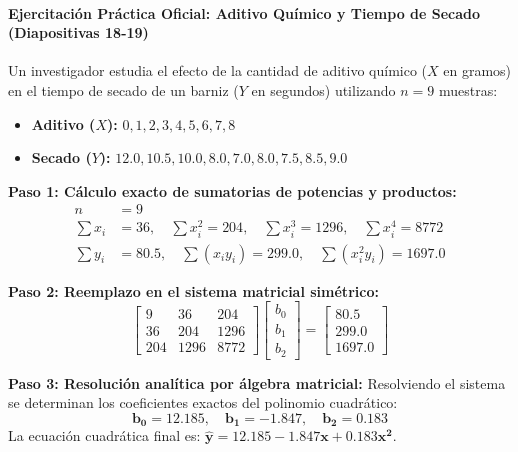 \documentclass[11pt,letterpaper]{article}
\begin{document}
\paragraph{Ejercitación Práctica Oficial: Aditivo Químico y Tiempo de Secado (Diapositivas 18-19)}
Un investigador estudia el efecto de la cantidad de aditivo químico ($X$ en gramos) en el tiempo de secado de un barniz ($Y$ en segundos) utilizando $n = 9$ muestras:
\begin{itemize}
    \item \textbf{Aditivo ($X$):} $0, 1, 2, 3, 4, 5, 6, 7, 8$
    \item \textbf{Secado ($Y$):} $12.0, 10.5, 10.0, 8.0, 7.0, 8.0, 7.5, 8.5, 9.0$
\end{itemize}

\textbf{Paso 1: Cálculo exacto de sumatorias de potencias y productos:}
\begin{align*}
    n &= 9 \\
    \sum x_i &= 36, \quad \sum x_i^2 = 204, \quad \sum x_i^3 = 1296, \quad \sum x_i^4 = 8772 \\
    \sum y_i &= 80.5, \quad \sum (x_i y_i) = 299.0, \quad \sum (x_i^2 y_i) = 1697.0
\end{align*}

\textbf{Paso 2: Reemplazo en el sistema matricial simétrico:}
\begin{equation}
    \begin{bmatrix}
        9 & 36 & 204 \\
        36 & 204 & 1296 \\
        204 & 1296 & 8772
    \end{bmatrix}
    \begin{bmatrix}
        b_0 \\ b_1 \\ b_2
    \end{bmatrix} =
    \begin{bmatrix}
        80.5 \\ 299.0 \\ 1697.0
    \end{bmatrix}
\end{equation}

\textbf{Paso 3: Resolución analítica por álgebra matricial:}
Resolviendo el sistema se determinan los coeficientes exactos del polinomio cuadrático:
\begin{equation}
    \mathbf{b_0 = 12.185, \quad b_1 = -1.847, \quad b_2 = 0.183}
\end{equation}
La ecuación cuadrática final es: $\mathbf{\hat{y} = 12.185 - 1.847x + 0.183x^2}$.
\end{document}
